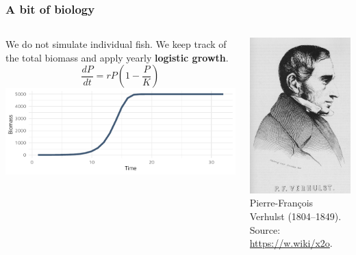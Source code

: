 \documentclass[table, 14pt, aspectratio=169]{beamer}
\newcommand{\hl}[1]{\textcolor{OxfordBlue}{\textbf{#1}}}
\begin{document}
\begin{frame}[t]\frametitle{A bit of biology}
  \begin{columns}
    \begin{column}{0.7\textwidth}
      {\small We do not simulate individual fish. We keep track of the total biomass and apply yearly \hl{logistic growth}.}
      $$\frac{dP}{dt}=r P \left(1 - \frac{P}{K}\right)$$
      \includegraphics[width=\linewidth]{images/logistic_growth.pdf}
    \end{column}
    \begin{column}{0.3\textwidth}
      \includegraphics[width=\linewidth]{images/Pierre_Francois_Verhulst.jpg}\\
      \tiny Pierre-François Verhulst (1804--1849).\\Source: \url{https://w.wiki/x2o}.
    \end{column}
  \end{columns}


\end{frame}
\end{document}
